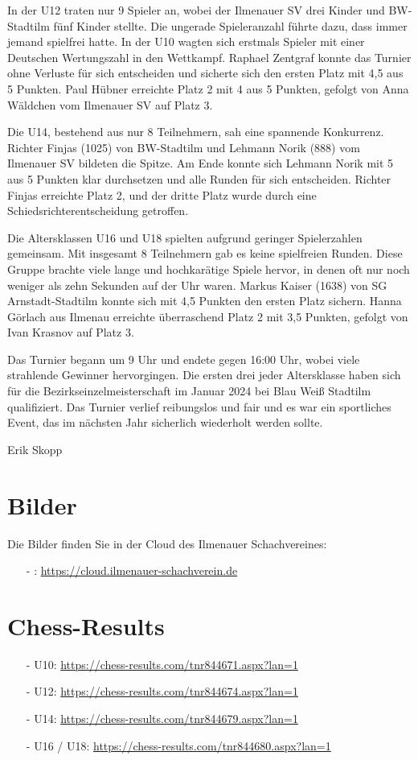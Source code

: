 \documentclass[a4paper,ngerman]{tui-algo-seminar}
\begin{document}
In der U12 traten nur 9 Spieler an, wobei der Ilmenauer SV drei Kinder und BW-Stadtilm fünf Kinder stellte. Die ungerade Spieleranzahl führte dazu, dass immer jemand spielfrei hatte. In der U10 wagten sich erstmals Spieler mit einer Deutschen Wertungszahl in den Wettkampf. Raphael Zentgraf konnte das Turnier ohne Verluste für sich entscheiden und sicherte sich den ersten Platz mit 4,5 aus 5 Punkten. Paul Hübner erreichte Platz 2 mit 4 aus 5 Punkten, gefolgt von Anna Wäldchen vom Ilmenauer SV auf Platz 3.

Die U14, bestehend aus nur 8 Teilnehmern, sah eine spannende Konkurrenz. Richter Finjas (1025) von BW-Stadtilm und Lehmann Norik (888) vom Ilmenauer SV bildeten die Spitze. Am Ende konnte sich Lehmann Norik mit 5 aus 5 Punkten klar durchsetzen und alle Runden für sich entscheiden. Richter Finjas erreichte Platz 2, und der dritte Platz wurde durch eine Schiedsrichterentscheidung getroffen.

Die Altersklassen U16 und U18 spielten aufgrund geringer Spielerzahlen gemeinsam. Mit insgesamt 8 Teilnehmern gab es keine spielfreien Runden. Diese Gruppe brachte viele lange und hochkarätige Spiele hervor, in denen oft nur noch weniger als zehn Sekunden auf der Uhr waren. Markus Kaiser (1638) von SG Arnstadt-Stadtilm konnte sich mit 4,5 Punkten den ersten Platz sichern. Hanna Görlach aus Ilmenau erreichte überraschend Platz 2 mit 3,5 Punkten, gefolgt von Ivan Krasnov auf Platz 3.

Das Turnier begann um 9 Uhr und endete gegen 16:00 Uhr, wobei viele strahlende Gewinner hervorgingen. Die ersten drei jeder Altersklasse haben sich für die Bezirkseinzelmeisterschaft im Januar 2024 bei Blau Weiß Stadtilm qualifiziert. Das Turnier verlief reibungslos und fair und es war ein sportliches Event, das im nächsten Jahr sicherlich wiederholt werden sollte.


Erik Skopp



\section{Bilder}
Die Bilder finden Sie in der Cloud des Ilmenauer Schachvereines: 
\begin{itemize}
	\item[-]: \url{https://cloud.ilmenauer-schachverein.de}
\end{itemize}

\section{Chess-Results}
\begin{itemize}
	\item[-] U10: \url{https://chess-results.com/tnr844671.aspx?lan=1}
	\item[-] U12: \url{https://chess-results.com/tnr844674.aspx?lan=1}
	\item[-] U14: \url{https://chess-results.com/tnr844679.aspx?lan=1}
	\item[-] U16 / U18: \url{https://chess-results.com/tnr844680.aspx?lan=1}
\end{itemize}
\cleardoublepage
\end{document}
